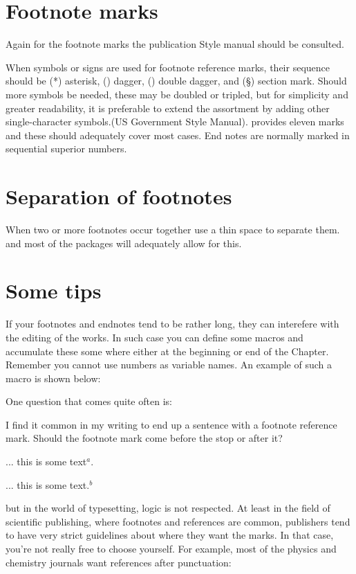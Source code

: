 \section*{Footnote marks}

Again for the footnote marks the publication Style manual should be consulted\pagenote{\noteiii}.

When symbols or signs are used for footnote reference marks, their 
sequence should be (*) asterisk, (\dag) dagger, (\ddag) double dagger, and 
(\S) section mark. Should more symbols be needed, these may be 
doubled or tripled, but for simplicity and greater readability, it is 
preferable to extend the assortment by adding other single-character symbols.(US Government Style Manual). \latex provides eleven marks and these should adequately cover most cases. End notes are normally marked in sequential superior numbers.

\section*{Separation of footnotes}

When two or more footnotes occur together use a thin space to separate them.
\tex and most of the packages will adequately allow for this.


\section{Some tips}

If your footnotes and endnotes tend to be rather long, they can interefere with the editing of the works. In such case you can define some macros and accumulate these some where either at the beginning or end of the Chapter. Remember you cannot use numbers as variable names. An example of such a macro is shown below:

One question that comes quite often is:

I find it common in my writing to end up a sentence with a footnote reference mark. Should the footnote mark come before the stop or after it?

... this is some text$^a$.

... this is some text.$^b$


but in the world of typesetting, logic is not respected. At least in the field of scientific publishing, where footnotes and references are common, publishers tend to have very strict guidelines about where they want the marks. In that case, you're not really free to choose yourself. For example, most of the physics and chemistry journals want references after punctuation:

